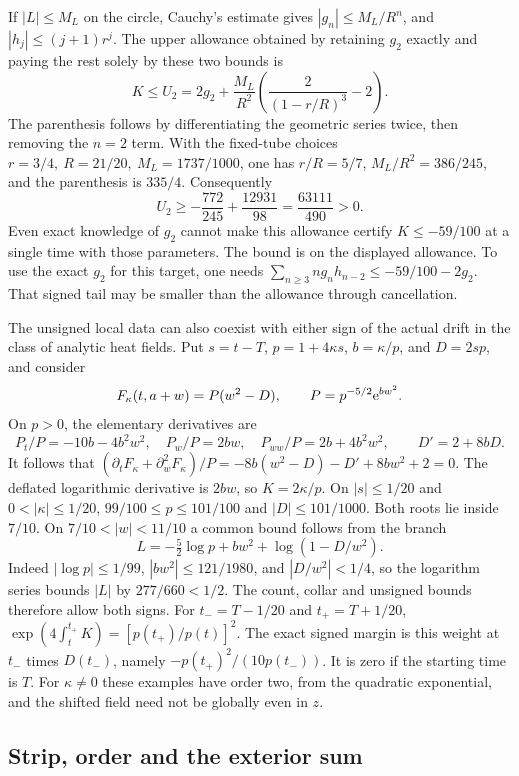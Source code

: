 If \(|L|\le M_L\) on the circle, Cauchy's estimate gives
\(|g_n|\le M_L/R^n\), and \(|h_j|\le (j+1)r^j\).
The upper allowance obtained by retaining \(g_2\) exactly and
paying the rest solely by these two bounds is
\begin{equation}
 K\le U_2=2g_2+
 \frac{M_L}{R^2}\left(\frac{2}{(1-r/R)^3}-2\right).
 \label{gt-laurent-allowance}
\end{equation}
The parenthesis follows by differentiating the geometric series
twice, then removing the \(n=2\) term. With the fixed-tube choices
\(r=3/4,\ R=21/20,\ M_L=1737/1000\), one has
\(r/R=5/7\), \(M_L/R^2=386/245\), and the parenthesis is \(335/4\).
Consequently
\[
 U_2\ge -\frac{772}{245}+\frac{12931}{98}
       =\frac{63111}{490}>0 .
\]
Even exact knowledge of \(g_2\) cannot make this allowance certify
\(K\le-59/100\) at a single time with those parameters. The bound
is on the displayed allowance. To use the exact \(g_2\) for this
target, one needs
\(\sum_{n\ge3} n g_n h_{n-2}\le-59/100-2g_2\).
That signed tail may be smaller than the allowance through cancellation.

The unsigned local data can also coexist with either sign of the actual
drift in the class of analytic heat fields. Put \(s=t-T\),
\(p=1+4\kappa s\), \(b=\kappa/p\), and \(D=2sp\), and consider
\[
 F_\kappa(t,a+w)=P(w^2-D),\qquad P=p^{-5/2}\mathrm e^{bw^2}.
\]
On \(p>0\), the elementary derivatives are
\[
  P_t/P=-10b-4b^2w^2,\quad P_w/P=2bw,\quad
  P_{ww}/P=2b+4b^2w^2,\qquad D'=2+8bD .
\]
It follows that \((\partial_t F_\kappa+\partial_w^2F_\kappa)/P
=-8b(w^2-D)-D'+8bw^2+2=0\). The deflated logarithmic derivative
is \(2bw\), so \(K=2\kappa/p\). On \(|s|\le1/20\) and
\(0<|\kappa|\le1/20\), \(99/100\le p\le101/100\) and
\(|D|\le101/1000\). Both roots lie inside \(7/10\).
On \(7/10<|w|<11/10\) a common bound follows from the branch
\[
 L=-\tfrac52\log p+bw^2+\log(1-D/w^2).
\]
Indeed \(|\log p|\le1/99\), \(|bw^2|\le121/1980\), and
\(|D/w^2|<1/4\), so the logarithm series bounds \(|L|\) by
\(277/660<1/2\). The count, collar and unsigned bounds therefore
allow both signs. For \(t_-=T-1/20\) and \(t_+=T+1/20\),
\(\exp(4\int_t^{t_+}K)=[p(t_+)/p(t)]^2\). The exact signed margin
is this weight at \(t_-\) times \(D(t_-)\), namely
\(-p(t_+)^2/(10p(t_-))\). It is zero if the starting time is \(T\).
For \(\kappa\ne0\) these examples have order two, from the quadratic
exponential, and the shifted field need not be globally even in \(z\).

\subsection{Strip, order and the exterior sum}

